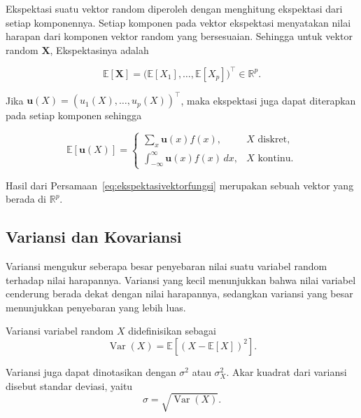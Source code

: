 \label{subsec:ekspektasivektor}

Ekspektasi suatu vektor random diperoleh dengan menghitung ekspektasi dari setiap komponennya. 
Setiap komponen pada vektor ekspektasi menyatakan nilai harapan dari komponen 
vektor random yang bersesuaian. Sehingga untuk vektor random $\bm{X}$,
Ekspektasinya adalah

\begin{equation}
\mathbb{E}[\bm{X}]
=
\bigl(
\mathbb{E}[X_1],\dots,\mathbb{E}[X_p]
\bigr)^{\top}
\in\mathbb{R}^{p}.
\label{eq:ekspektasivektor}
\end{equation}

Jika $\bm{u}(X)=(u_1(X),\dots,u_p(X))^\top$, maka ekspektasi juga dapat
diterapkan pada setiap komponen sehingga

\begin{equation}
\mathbb{E}[\bm{u}(X)]
=
\begin{cases}
\displaystyle\sum_x \bm{u}(x)f(x), & X \text{ diskret},\\[1.2ex]
\displaystyle\int_{-\infty}^{\infty}
\bm{u}(x)f(x)\,dx, & X \text{ kontinu}.
\end{cases}
\label{eq:ekspektasivektorfungsi}
\end{equation}

Hasil dari Persamaan~\eqref{eq:ekspektasivektorfungsi} merupakan sebuah
vektor yang berada di $\mathbb{R}^p$.

\subsection{Variansi dan Kovariansi}
\label{subsec:variansi}

Variansi mengukur seberapa besar penyebaran nilai suatu variabel random terhadap nilai harapannya. Variansi yang kecil menunjukkan bahwa nilai variabel cenderung berada dekat dengan nilai harapannya, sedangkan variansi yang besar menunjukkan penyebaran yang lebih luas.

\begin{definisi}
\label{def:variansi}

Variansi variabel random \(X\) didefinisikan sebagai
\begin{equation}
\operatorname{Var}(X)
=
\mathbb{E}\left[(X-\mathbb{E}[X])^2\right].
\label{eq:variansi}
\end{equation}

Variansi juga dapat dinotasikan dengan \(\sigma^2\) atau \(\sigma_X^2\).
Akar kuadrat dari variansi disebut standar deviasi, yaitu
\begin{equation}
\sigma=\sqrt{\operatorname{Var}(X)}.
\label{eq:standardeviasi}
\end{equation}
\end{definisi}

